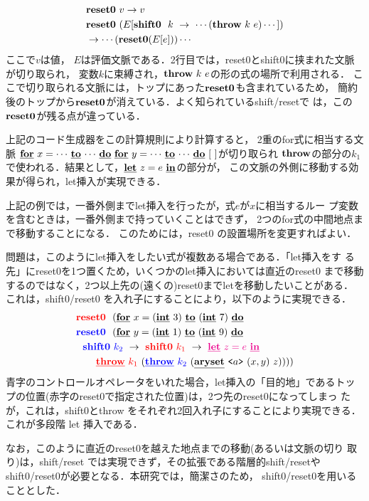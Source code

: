
\begin{align*}
& \Resetz ~v \to v \\
& \Resetz ~(E[\Shiftz~~k~\to~\cdots(\Throw~k~e)\cdots]) \\
& \to \cdots(\Resetz(E[e]))\cdots
\end{align*}
ここで$v$は値，
$E$は評価文脈である．2行目では，reset0とshift0に挟まれた文脈が切り取られ，
変数$k$に束縛され，$\Throw~k~e$の形の式の場所で利用される．
ここで切り取られる文脈には，トップにあった$\Resetz$も含まれているため，
簡約後のトップから$\Resetz$が消えている．よく知られているshift/resetで
は，この$\Resetz$が残る点が違っている．

上記のコード生成器をこの計算規則により計算すると，
2重のfor式に相当する文脈
$\cforin{x=\cdots}{\cdots}~\cforin{y=\cdots}{\cdots}~[~]$が切り取られ
$\Throw$の部分の$k_1$で使われる．結果として，$\cLet~z=e~\cIn$の部分が，
この文脈の外側に移動する効果が得られ，let挿入が実現できる．

上記の例では，一番外側までlet挿入を行ったが，式$e$が$x$に相当するルー
プ変数を含むときは，一番外側まで持っていくことはできず，
2つのfor式の中間地点まで移動することになる．
このためには，reset0 の設置場所を変更すればよい．

問題は，このようにlet挿入をしたい式が複数ある場合である．「let挿入をす
る先」にreset0を1つ置くため，いくつかのlet挿入においては直近のreset0
まで移動するのではなく，2つ以上先の(遠くの)reset0までletを移動したいことがある．
これは，shift0/reset0 を入れ子にすることにより，以下のように実現できる．
\begin{align*}
&\red{\Resetz} ~~(\cforin{x=(\cint~3)}{(\cint~7)} \\
&\blue{\Resetz} ~~(\cforin{y=(\cint~1)}{(\cint~9)} \\
&~~\blue{\Shiftz}~\blue{k_2}~\to~ \red{\Shiftz}~\red{k_1}~\to~ \magenta{\cLet~z=e~\cIn} \\
&~~~~~~
  \red{\cThrow}~\red{k_1}~(\blue{\cThrow}~\blue{k_2}~(\caryset{\code{a}}{(x,y)}{z}))))
\end{align*}
青字のコントロールオペレータをいれた場合，let挿入の「目的地」であるトッ
プの位置(赤字のreset0で指定された位置)は，2つ先のreset0になってしまっ
たが，これは，shift0とthrow をそれぞれ2回入れ子にすることにより実現できる．
これが多段階 let 挿入である．

なお，このように直近のreset0を越えた地点までの移動(あるいは文脈の切り
取り)は，shift/reset では実現できず，その拡張である階層的shift/resetや
shift0/reset0が必要となる．本研究では，簡潔さのため，
shift0/reset0を用いることとした．

